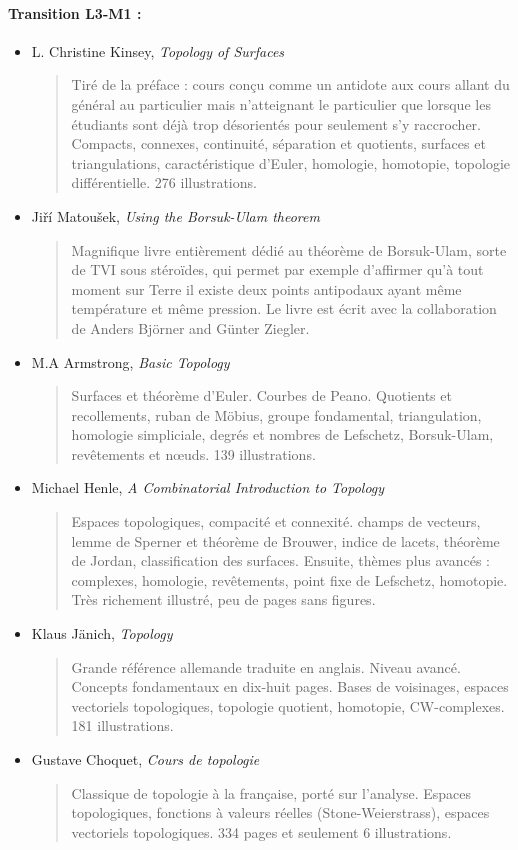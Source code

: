 \documentclass{article}
\begin{document}
\paragraph{Transition L3-M1 :}
\begin{itemize}

\item L. Christine Kinsey, \emph{Topology of Surfaces}
\begin{quote}
Tiré de la préface : \og cours conçu comme un antidote aux cours allant du général au particulier mais n'atteignant le particulier que lorsque les étudiants sont déjà trop désorientés pour seulement s'y raccrocher.\fg{} Compacts, connexes, continuité, séparation et quotients, surfaces et triangulations, caractéristique d'Euler, homologie, homotopie, topologie différentielle.  276 illustrations.
\end{quote}
\item Jiří Matoušek, \emph{Using the Borsuk-Ulam theorem}
\begin{quote}
Magnifique livre entièrement dédié au théorème de Borsuk-Ulam, sorte de TVI sous stéroïdes, qui permet par exemple d'affirmer qu'à tout moment sur Terre il existe deux points antipodaux ayant même température et même pression. Le livre est écrit avec la collaboration de Anders Björner and Günter Ziegler.
\end{quote}
\item M.A Armstrong, \emph{Basic Topology}
\begin{quote}
Surfaces et théorème d'Euler. Courbes de Peano. Quotients et recollements, ruban de Möbius, groupe fondamental, triangulation, homologie simpliciale, degrés et nombres de Lefschetz, Borsuk-Ulam, revêtements et n\oe uds. 139 illustrations. 
\end{quote}
\item Michael Henle, \emph{A Combinatorial Introduction to Topology}
\begin{quote}
Espaces topologiques, compacité et connexité. champs de vecteurs, lemme de Sperner et théorème de Brouwer, indice de lacets, théorème de Jordan, classification des surfaces. Ensuite, thèmes plus avancés : complexes, homologie, revêtements, point fixe de Lefschetz, homotopie. Très richement illustré, peu de pages sans figures.
\end{quote}
\item Klaus Jänich, \emph{Topology}
\begin{quote}
Grande référence allemande traduite en anglais.  Niveau avancé. \og Concepts fondamentaux\fg{} en dix-huit pages. Bases de voisinages, espaces vectoriels topologiques, topologie quotient, homotopie, CW-complexes. 181 illustrations.
\end{quote}
\item Gustave Choquet, \emph{Cours de topologie}
\begin{quote}
Classique de topologie à la française, porté sur l'analyse. Espaces topologiques, fonctions à valeurs réelles (Stone-Weierstrass), espaces vectoriels topologiques. 334 pages et seulement 6 illustrations.
\end{quote}

\end{itemize}
\end{document}
